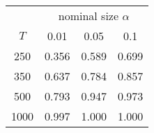 % 
\begin{tabular}{cccc}
  \hline
  & \multicolumn{3}{c}{nominal size $\alpha$} \\
 $T$ & 0.01 & 0.05 & 0.1 \\
 \hline
250 & 0.356 & 0.589 & 0.699 \\ 
  350 & 0.637 & 0.784 & 0.857 \\ 
  500 & 0.793 & 0.947 & 0.973 \\ 
  1000 & 0.997 & 1.000 & 1.000 \\ 
   \hline
\end{tabular}
